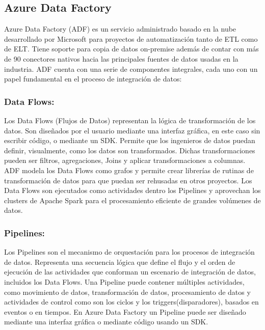 \subsection{Azure Data Factory}

Azure Data Factory (ADF) es un servicio administrado basado en la nube desarrollado por Microsoft para proyectos de 
automatización tanto de ETL como de ELT. Tiene soporte para copia de datos on-premise además de contar con  
m\'as de 90 conectores nativos hacia las principales fuentes de datos usadas en la industria\cite{azure_intro}. ADF cuenta con una 
serie de componentes integrales, cada uno con un papel fundamental en el proceso de integración de datos: 

\subsubsection{Data Flows:}

Los Data Flows (Flujos de Datos) representan la lógica de transformación de los datos. Son diseñados por el usuario 
mediante una interfaz gráfica, en este caso sin escribir código, o mediante un SDK. Permite que los ingenieros de 
datos puedan definir, visualmente, como los datos son transformados. Dichas transformaciones pueden ser filtros, 
agregaciones, Joins y aplicar transformaciones a columnas. ADF modela los Data Flows como grafos y permite crear 
librerías de rutinas de transformaci\'on de datos para que puedan ser rehusadas en otros proyectos. Los Data Flows 
son ejecutados como actividades dentro los Pipelines y aprovechan los clusters de Apache Spark para el procesamiento 
eficiente de grandes volúmenes de datos. 


\subsubsection{Pipelines:}

Los Pipelines son el mecanismo de orquestación para los procesos de integración de datos. Representa una secuencia 
lógica que define el flujo y el orden de ejecución de las actividades que conforman un escenario de integración de datos, 
incluidos los Data Flows. Una Pipeline puede contener múltiples actividades, como movimiento de datos, 
transformación de datos, procesamiento de datos y actividades de control como son los ciclos y los 
triggers(disparadores), basados en eventos o en tiempos. En Azure Data Factory un Pipeline puede ser diseñado 
mediante una interfaz gr\'afica o mediante c\'odigo usando un SDK.

